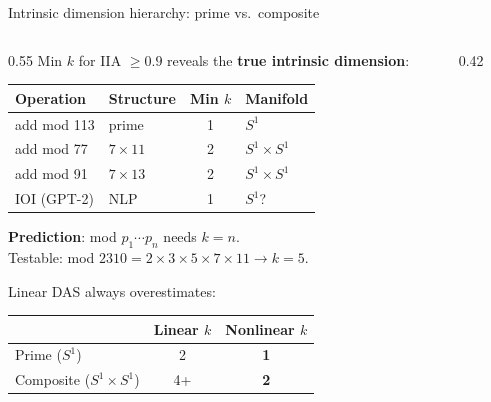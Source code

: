 \documentclass[aspectratio=169,11pt]{beamer}
\begin{document}
\begin{frame}{Intrinsic dimension hierarchy: prime vs.\ composite}
\vspace{-0.3em}

\begin{columns}[T]
\begin{column}{0.55\textwidth}
{\small Min $k$ for IIA $\geq 0.9$ reveals the \textbf{true intrinsic dimension}:}

\vspace{0.3em}
{\scriptsize
\begin{tabular}{@{}llcl@{}}
\toprule
\textbf{Operation} & \textbf{Structure} & \textbf{Min $k$} & \textbf{Manifold} \\
\midrule
add mod 113 & prime & 1 & $S^1$ \\
add mod 77 & $7 \times 11$ & 2 & $S^1 \times S^1$ \\
add mod 91 & $7 \times 13$ & 2 & $S^1 \times S^1$ \\
IOI (GPT-2) & NLP & 1 & $S^1$? \\
\bottomrule
\end{tabular}}

\vspace{0.3em}
{\small\textbf{Prediction}: mod $p_1 \cdots p_n$ needs $k = n$.\\
Testable: mod $2310 = 2{\times}3{\times}5{\times}7{\times}11 \to k{=}5$.}

\vspace{0.3em}
{\scriptsize Linear DAS always overestimates:}\\[0.1em]
{\scriptsize
\begin{tabular}{@{}lcc@{}}
& \textbf{Linear $k$} & \textbf{Nonlinear $k$} \\
\midrule
Prime ($S^1$) & 2 & \textbf{1} \\
Composite ($S^1 {\times} S^1$) & 4+ & \textbf{2} \\
\end{tabular}}
\end{column}
\begin{column}{0.42\textwidth}
\centering

\end{column}
\end{columns}
\end{frame}
\end{document}
